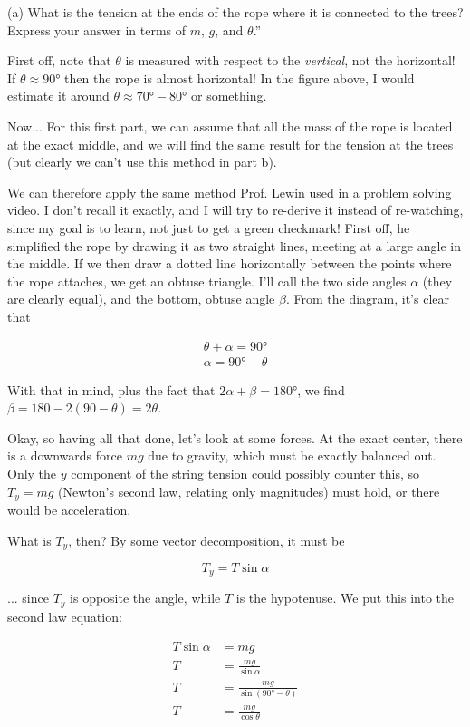 \documentclass[8.01x]{subfiles}
\begin{document}
(a) What is the tension at the ends of the rope where it is connected to the trees? Express your answer in terms of $m$, $g$, and $\theta$.''

First off, note that $\theta$ is measured with respect to the \emph{vertical}, not the horizontal! If $\theta \approx \ang{90}$ then the rope is almost horizontal! In the figure above, I would estimate it around $\theta \approx \ang{70}-\ang{80}$ or something.

Now... For this first part, we can assume that all the mass of the rope is located at the exact middle, and we will find the same result for the tension at the trees (but clearly we can't use this method in part b).

We can therefore apply the same method Prof. Lewin used in a problem solving video. I don't recall it exactly, and I will try to re-derive it instead of re-watching, since my goal is to learn, not just to get a green checkmark! First off, he simplified the rope by drawing it as two straight lines, meeting at a large angle in the middle. If we then draw a dotted line horizontally between the points where the rope attaches, we get an obtuse triangle. I'll call the two side angles $\alpha$ (they are clearly equal), and the bottom, obtuse angle $\beta$. From the diagram, it's clear that

\begin{align}
\theta + \alpha = \ang{90}\\
\alpha = \ang{90} - \theta
\end{align}

With that in mind, plus the fact that $2 \alpha + \beta = \ang{180}$, we find $\beta = 180 - 2(90 - \theta) = 2 \theta$.

Okay, so having all that done, let's  look at some forces. At the exact center, there is a downwards force $m g$ due to gravity, which must be exactly balanced out. Only the $y$ component of the string tension could possibly counter this, so $T_y = m g$ (Newton's second law, relating only magnitudes) must hold, or there would be acceleration.

What is $T_y$, then? By some vector decomposition, it must be

\begin{equation}
T_y = T \sin \alpha
\end{equation}

... since $T_y$ is opposite the angle, while $T$ is the hypotenuse. We put this into the second law equation:

\begin{align}
T \sin \alpha &= m g\\
T &= \frac{m g}{\sin \alpha}\\
T &= \frac{m g}{\sin (\ang{90} - \theta)}\\
T &= \frac{m g}{\cos\theta}
\end{align}
\end{document}
